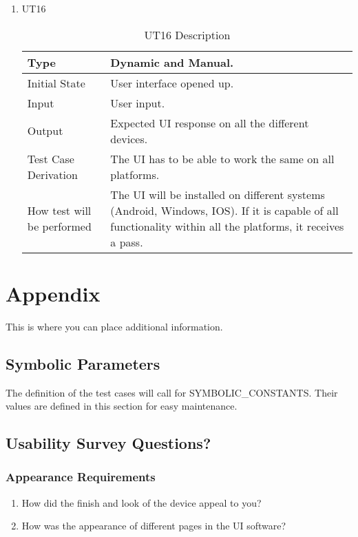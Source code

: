 \documentclass[12pt, titlepage]{article}
\begin{document}
\begin{enumerate}
\begin{table}[H]
\begin{tabular}{ |p{5cm}||p{7cm}| }
    \hline
\end{tabular}
\end{table}
\item{UT16}
\begin{table}[H]
    \caption{UT16 Description}
\begin{tabular}{ |p{5cm}||p{7cm}| }
    \hline
    Type & Dynamic and Manual. \\
    \hline
    Initial State  &  User interface opened up. \\
    \hline
    Input &   User input. \\
    \hline
    Output &   Expected UI response on all the different devices.  \\
    \hline
    Test Case Derivation &   The UI has to be able to work the same on all platforms. \\
    \hline
    How test will be performed & The UI will be installed on different systems (Android, Windows, IOS). If it is capable of all functionality within all the platforms, it receives a pass. \\
    \hline
\end{tabular}
\end{table}
\end{enumerate}


\newpage

\section{Appendix}

This is where you can place additional information.

\subsection{Symbolic Parameters}

The definition of the test cases will call for SYMBOLIC\_CONSTANTS.
Their values are defined in this section for easy maintenance.

\subsection{Usability Survey Questions?}

\subsubsection{Appearance Requirements}

\begin{enumerate}
\item{How did the finish and look of the device appeal to you?\\}
\item{How was the appearance of different pages in the UI software?\\}

\end{enumerate}
\end{document}
